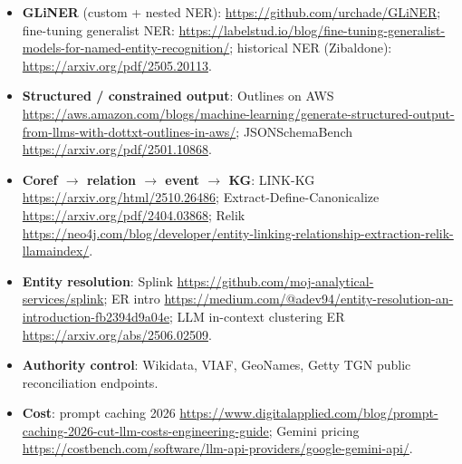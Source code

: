 \documentclass[11pt]{article}
\begin{document}
\begin{itemize}[leftmargin=*]
  \item \textbf{GLiNER} (custom + nested NER): \url{https://github.com/urchade/GLiNER};
        fine-tuning generalist NER:
        \url{https://labelstud.io/blog/fine-tuning-generalist-models-for-named-entity-recognition/};
        historical NER (Zibaldone): \url{https://arxiv.org/pdf/2505.20113}.
  \item \textbf{Structured / constrained output}: Outlines on AWS
        \url{https://aws.amazon.com/blogs/machine-learning/generate-structured-output-from-llms-with-dottxt-outlines-in-aws/};
        JSONSchemaBench \url{https://arxiv.org/pdf/2501.10868}.
  \item \textbf{Coref $\to$ relation $\to$ event $\to$ KG}: LINK-KG
        \url{https://arxiv.org/html/2510.26486}; Extract-Define-Canonicalize
        \url{https://arxiv.org/pdf/2404.03868}; Relik
        \url{https://neo4j.com/blog/developer/entity-linking-relationship-extraction-relik-llamaindex/}.
  \item \textbf{Entity resolution}: Splink
        \url{https://github.com/moj-analytical-services/splink}; ER intro
        \url{https://medium.com/@adev94/entity-resolution-an-introduction-fb2394d9a04e};
        LLM in-context clustering ER \url{https://arxiv.org/abs/2506.02509}.
  \item \textbf{Authority control}: Wikidata, VIAF, GeoNames, Getty TGN public
        reconciliation endpoints.
  \item \textbf{Cost}: prompt caching 2026
        \url{https://www.digitalapplied.com/blog/prompt-caching-2026-cut-llm-costs-engineering-guide};
        Gemini pricing \url{https://costbench.com/software/llm-api-providers/google-gemini-api/}.
\end{itemize}
\end{document}
